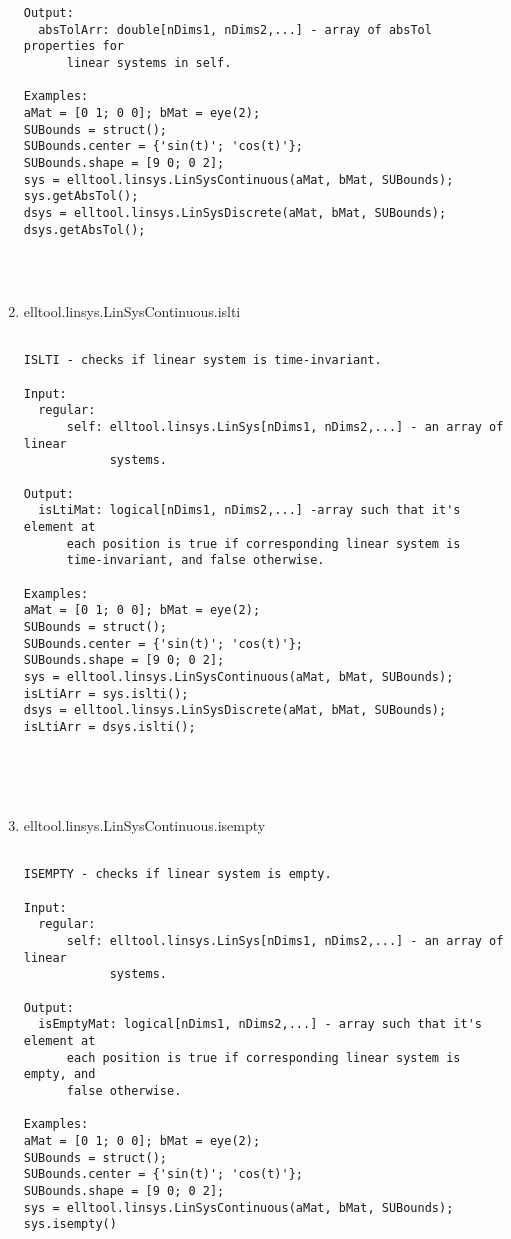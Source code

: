 \begin{enumerate}
\begin{lstlisting}
Output:
  absTolArr: double[nDims1, nDims2,...] - array of absTol properties for
      linear systems in self.

Examples:
aMat = [0 1; 0 0]; bMat = eye(2);
SUBounds = struct();
SUBounds.center = {'sin(t)'; 'cos(t)'};
SUBounds.shape = [9 0; 0 2];
sys = elltool.linsys.LinSysContinuous(aMat, bMat, SUBounds);
sys.getAbsTol();
dsys = elltool.linsys.LinSysDiscrete(aMat, bMat, SUBounds);
dsys.getAbsTol();




\end{lstlisting}
\fontfamily{\familydefault}
\selectfont
\item {elltool.linsys.LinSysContinuous.islti}
\selectfont
\begin{lstlisting}

ISLTI - checks if linear system is time-invariant.

Input:
  regular:
      self: elltool.linsys.LinSys[nDims1, nDims2,...] - an array of linear
            systems.

Output:
  isLtiMat: logical[nDims1, nDims2,...] -array such that it's element at
      each position is true if corresponding linear system is
      time-invariant, and false otherwise.

Examples:
aMat = [0 1; 0 0]; bMat = eye(2);
SUBounds = struct();
SUBounds.center = {'sin(t)'; 'cos(t)'};
SUBounds.shape = [9 0; 0 2];
sys = elltool.linsys.LinSysContinuous(aMat, bMat, SUBounds);
isLtiArr = sys.islti();
dsys = elltool.linsys.LinSysDiscrete(aMat, bMat, SUBounds);
isLtiArr = dsys.islti();





\end{lstlisting}
\fontfamily{\familydefault}
\selectfont
\item {elltool.linsys.LinSysContinuous.isempty}
\selectfont
\begin{lstlisting}

ISEMPTY - checks if linear system is empty.

Input:
  regular:
      self: elltool.linsys.LinSys[nDims1, nDims2,...] - an array of linear
            systems.

Output:
  isEmptyMat: logical[nDims1, nDims2,...] - array such that it's element at
      each position is true if corresponding linear system is empty, and
      false otherwise.

Examples:
aMat = [0 1; 0 0]; bMat = eye(2);
SUBounds = struct();
SUBounds.center = {'sin(t)'; 'cos(t)'};
SUBounds.shape = [9 0; 0 2];
sys = elltool.linsys.LinSysContinuous(aMat, bMat, SUBounds);
sys.isempty()


\end{lstlisting}
\end{enumerate}

